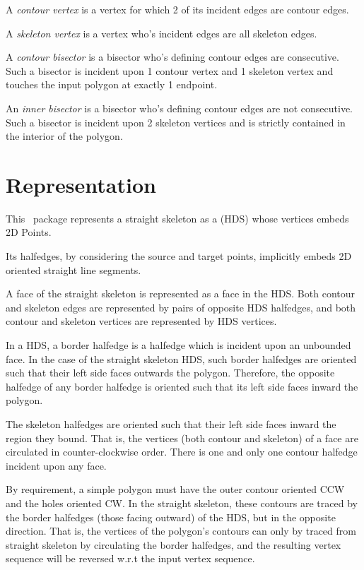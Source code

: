 A {\em contour vertex} is a vertex for which 2 of its incident edges are contour edges.

A {\em skeleton vertex} is a vertex who's incident edges are all skeleton edges.

A {\em contour bisector} is a bisector who's defining contour edges
are consecutive. Such a bisector is incident upon 1 contour vertex and
1 skeleton vertex and touches the input polygon at exactly 1 endpoint.

An {\em inner bisector} is a bisector who's defining contour edges are
not consecutive. Such a bisector is incident upon 2 skeleton vertices
and is strictly contained in the interior of the polygon.



\section{Representation}

This \cgal\ package represents a straight skeleton as a  (HDS) whose vertices embeds 2D Points.

Its halfedges, by considering the source and target points, implicitly embeds 2D oriented straight line segments. 

A face of the straight skeleton is represented as a face in the
HDS. Both contour and skeleton edges are represented by pairs of
opposite HDS halfedges, and both contour and skeleton vertices are
represented by HDS vertices.

In a HDS, a border halfedge is a halfedge which is incident upon an
unbounded face. In the case of the straight skeleton HDS, such border
halfedges are oriented such that their left side faces outwards the
polygon. Therefore, the opposite halfedge of any border halfedge is
oriented such that its left side faces inward the polygon.

The skeleton halfedges are oriented such that their left side faces
inward the region they bound. That is, the vertices (both contour and
skeleton) of a face are circulated in counter-clockwise order. There
is one and only one contour halfedge incident upon any face.

By requirement, a simple polygon must have the outer contour oriented
CCW and the holes oriented CW. In the straight skeleton, these
contours are traced by the border halfedges (those facing
outward) of the HDS, but in the opposite direction. That is, the
vertices of the polygon's contours can only by traced from straight
skeleton by circulating the border halfedges, and the resulting vertex
sequence will be reversed w.r.t the input vertex sequence.

